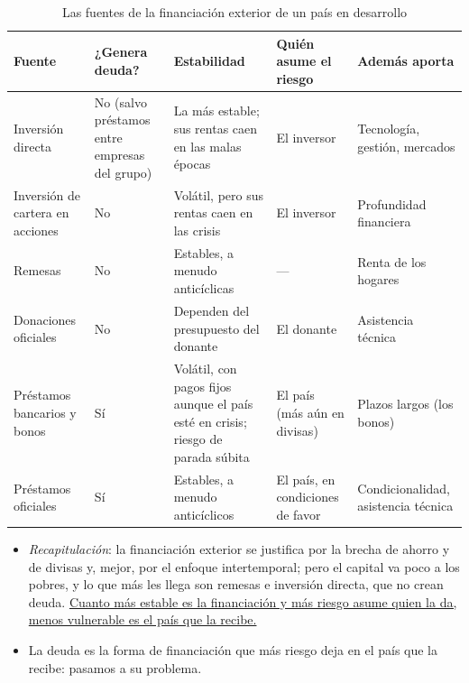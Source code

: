 \documentclass[11pt]{article}
\begin{document}
\begin{table}[H]
\centering
\caption{Las fuentes de la financiación exterior de un país en desarrollo}\label{tab:fuentes-desarrollo}
\small
\begin{tabular}{>{\raggedright\arraybackslash}m{2.9cm}>{\raggedright\arraybackslash}m{2.5cm}>{\raggedright\arraybackslash}m{3.4cm}>{\raggedright\arraybackslash}m{2.6cm}>{\raggedright\arraybackslash}m{2.6cm}}
\toprule
\rowcolor{tceeazulpalido} Fuente & ¿Genera deuda? & Estabilidad & Quién asume el riesgo & Además aporta \\
\midrule
Inversión directa & No (salvo préstamos entre empresas del grupo) & La más estable; sus rentas caen en las malas épocas & El inversor & Tecnología, gestión, mercados \\
Inversión de cartera en acciones & No & Volátil, pero sus rentas caen en las crisis & El inversor & Profundidad financiera \\
Remesas & No & Estables, a menudo anticíclicas & — & Renta de los hogares \\
Donaciones oficiales & No & Dependen del presupuesto del donante & El donante & Asistencia técnica \\
Préstamos bancarios y bonos & Sí & Volátil, con pagos fijos aunque el país esté en crisis; riesgo de parada súbita & El país (más aún en divisas) & Plazos largos (los bonos) \\
Préstamos oficiales & Sí & Estables, a menudo anticíclicos & El país, en condiciones de favor & Condicionalidad, asistencia técnica \\
\bottomrule
\end{tabular}
\end{table}

\begin{itemize}
\item \emph{Recapitulación}: la financiación exterior se justifica por la brecha de ahorro y de divisas y, mejor, por el enfoque intertemporal; pero el capital va poco a los pobres, y lo que más les llega son remesas e inversión directa, que no crean deuda. \uline{Cuanto más estable es la financiación y más riesgo asume quien la da, menos vulnerable es el país que la recibe.}
\item La deuda es la forma de financiación que más riesgo deja en el país que la recibe: pasamos a su problema.
\end{itemize}
\end{document}
